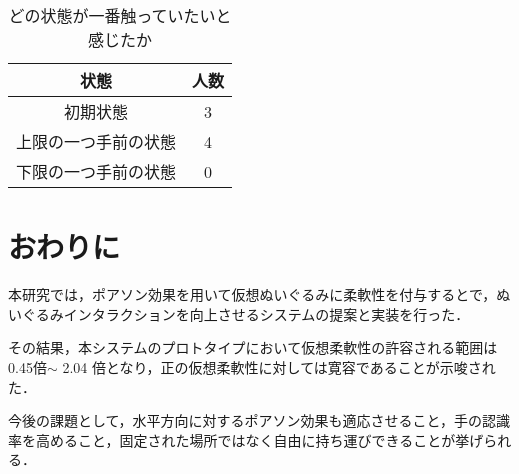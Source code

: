 \documentclass[uplatex]{jsarticle}   %
\begin{document}

    \begin{table}[t]
        \caption{\label{tab:result3}どの状態が一番触っていたいと感じたか}
        \centering
        \begin{tabular}{c|c}
            \hline
            \hline
            状態 &人数 \\
            \hline
            初期状態 &3 \\
            上限の一つ手前の状態 &4 \\
            下限の一つ手前の状態 &0 \\
            \hline
        \end{tabular}
    \end{table}

\section{おわりに}
本研究では，ポアソン効果を用いて仮想ぬいぐるみに柔軟性を付与するとで，ぬいぐるみインタラクションを向上させるシステムの提案と実装を行った．

その結果，本システムのプロトタイプにおいて仮想柔軟性の許容される範囲は 0.45倍$\sim$ 2.04 倍となり，正の仮想柔軟性に対しては寛容であることが示唆された．

今後の課題として，水平方向に対するポアソン効果も適応させること，手の認識率を高めること，固定された場所ではなく自由に持ち運びできることが挙げられる．




\end{document}
